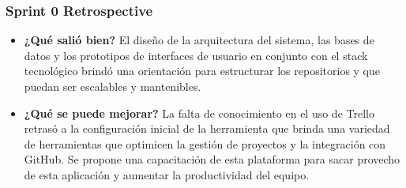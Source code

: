 \subsubsection{Sprint 0 Retrospective}
\begin{itemize}
    \item \textbf{¿Qué salió bien?} \newline
    El diseño de la arquitectura del sistema, las bases de datos y los prototipos de interfaces de usuario en conjunto con el stack tecnológico brindó una orientación para estructurar los repositorios y que puedan ser escalables y mantenibles.

    \item \textbf{¿Qué se puede mejorar?} \newline
    La falta de conocimiento en el uso de Trello retrasó a la configuración inicial de la herramienta que brinda una variedad de herramientas que optimicen la gestión de proyectos y la integración con GitHub. Se propone una capacitación de esta plataforma para sacar provecho de esta aplicación y aumentar la productividad del equipo.
\end{itemize}
